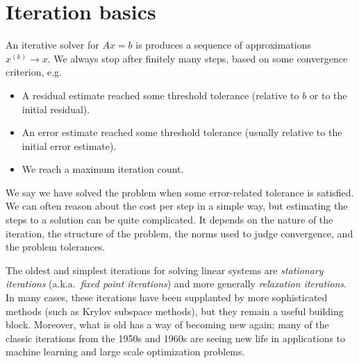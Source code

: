 \section{Iteration basics}

An iterative solver for $Ax = b$ is produces a sequence of
approximations $x^{(k)} \rightarrow x$.  We always stop after
finitely many steps, based on some convergence criterion, e.g.
\begin{itemize}
\item A residual estimate reached some threshold tolerance
  (relative to $b$ or to the initial residual).
\item An error estimate reached some threshold tolerance
  (usually relative to the initial error estimate).
\item We reach a maximum iteration count.
\end{itemize}
We say we have solved the problem when some error-related tolerance
is satisfied.  We can often reason about the cost per step in a
simple way, but estimating the steps to a solution can be
quite complicated.  It depends on the nature of the iteration, the
structure of the problem, the norms used to judge convergence, and
the problem tolerances.

The oldest and simplest iterations for solving linear systems are
{\em stationary iterations} (a.k.a.~{\em fixed point iterations})
and more generally {\em relaxation iterations}.
In many cases, these iterations have been supplanted by more
sophisticated methods (such as Krylov subspace methods), but they
remain a useful building block.  Moreover, what is old has a way of
becoming new again; many of the classic iterations from the 1950s
and 1960s are seeing new life in applications to machine learning
and large scale optimization problems.
